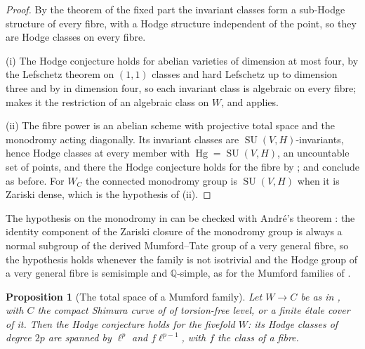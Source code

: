\documentclass[11pt,reqno]{amsart}
\theoremstyle{plain}
\newtheorem{proposition}[theorem]{Proposition}
\theoremstyle{definition}
\theoremstyle{remark}
\newcommand{\QQ}{\mathbb{Q}}
\DeclareMathOperator{\Hg}{Hg}
\DeclareMathOperator{\SU}{SU}
\begin{document}
\begin{proof}
By the theorem of the fixed part the invariant classes form a sub-Hodge
structure of every fibre, with a Hodge structure independent of the point, so
they are Hodge classes on every fibre.

(i) The Hodge conjecture holds for abelian varieties of dimension at most
four, by the Lefschetz theorem on $(1,1)$ classes and hard Lefschetz up to
dimension three and by \cite{Mar25a} in dimension four, so each invariant
class is algebraic on every fibre;  makes it the
restriction of an algebraic class on $W$, and 
applies.

(ii) The fibre power is an abelian scheme with projective total space and
the monodromy acting diagonally. Its invariant classes are
$\SU(V,H)$-invariants, hence Hodge classes at every member with
$\Hg=\SU(V,H)$, an uncountable set of points, and there the Hodge conjecture
holds for the fibre by ;  and
 conclude as before. For $W_{C}$ the connected
monodromy group is $\SU(V,H)$ when it is Zariski dense, which is the
hypothesis of (ii).
\end{proof}

The hypothesis on the monodromy in  can be checked
with Andr\'e's theorem \cite[Theorem~1]{And92}: the identity component of the
Zariski closure of the monodromy group is always a normal subgroup of the
derived Mumford--Tate group of a very general fibre, so the hypothesis holds
whenever the family is not isotrivial and the Hodge group of a very general
fibre is semisimple and $\QQ$-simple, as for the Mumford families of
.

\begin{proposition}[The total space of a Mumford family]
\label{prop:mumfordfivefold}
Let $W\to C$ be as in , with $C$ the compact
Shimura curve of \cite{Mum69} of torsion-free level, or a finite \'etale cover
of it. Then the Hodge conjecture holds for the fivefold $W$: its Hodge classes
of degree $2p$ are spanned by $\ell^{p}$ and $f\ell^{p-1}$, with $f$ the class
of a fibre.
\end{proposition}
\end{document}
